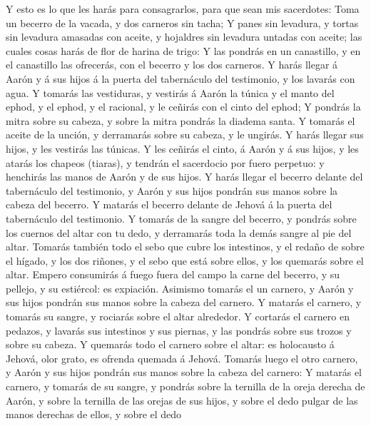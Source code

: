  Y esto es lo que les harás para consagrarlos, para que sean
mis sacerdotes: Toma un becerro de la vacada, y dos carneros sin tacha;
 Y panes sin levadura, y tortas sin levadura amasadas con
aceite, y hojaldres sin levadura untadas con aceite; las cuales cosas
harás de flor de harina de trigo:  Y las pondrás en un
canastillo, y en el canastillo las ofrecerás, con el becerro y los dos
carneros.  Y harás llegar á Aarón y á sus hijos á la puerta
del tabernáculo del testimonio, y los lavarás con agua.  Y
tomarás las vestiduras, y vestirás á Aarón la túnica y el manto del
ephod, y el ephod, y el racional, y le ceñirás con el cinto del ephod;
 Y pondrás la mitra sobre su cabeza, y sobre la mitra
pondrás la diadema santa.  Y tomarás el aceite de la unción,
y derramarás sobre su cabeza, y le ungirás.  Y harás llegar
sus hijos, y les vestirás las túnicas.  Y les ceñirás el
cinto, á Aarón y á sus hijos, y les atarás los chapeos (tiaras), y
tendrán el sacerdocio por fuero perpetuo: y henchirás las manos de Aarón
y de sus hijos.  Y harás llegar el becerro delante del
tabernáculo del testimonio, y Aarón y sus hijos pondrán sus manos sobre
la cabeza del becerro.  Y matarás el becerro delante de
Jehová á la puerta del tabernáculo del testimonio.  Y
tomarás de la sangre del becerro, y pondrás sobre los cuernos del altar
con tu dedo, y derramarás toda la demás sangre al pie del altar.
 Tomarás también todo el sebo que cubre los intestinos, y
el redaño de sobre el hígado, y los dos riñones, y el sebo que está
sobre ellos, y los quemarás sobre el altar.  Empero
consumirás á fuego fuera del campo la carne del becerro, y su pellejo, y
su estiércol: es expiación.  Asimismo tomarás el un
carnero, y Aarón y sus hijos pondrán sus manos sobre la cabeza del
carnero.  Y matarás el carnero, y tomarás su sangre, y
rociarás sobre el altar alrededor.  Y cortarás el carnero
en pedazos, y lavarás sus intestinos y sus piernas, y las pondrás sobre
sus trozos y sobre su cabeza.  Y quemarás todo el carnero
sobre el altar: es holocausto á Jehová, olor grato, es ofrenda quemada á
Jehová.  Tomarás luego el otro carnero, y Aarón y sus hijos
pondrán sus manos sobre la cabeza del carnero:  Y matarás
el carnero, y tomarás de su sangre, y pondrás sobre la ternilla de la
oreja derecha de Aarón, y sobre la ternilla de las orejas de sus hijos,
y sobre el dedo pulgar de las manos derechas de ellos, y sobre el dedo

